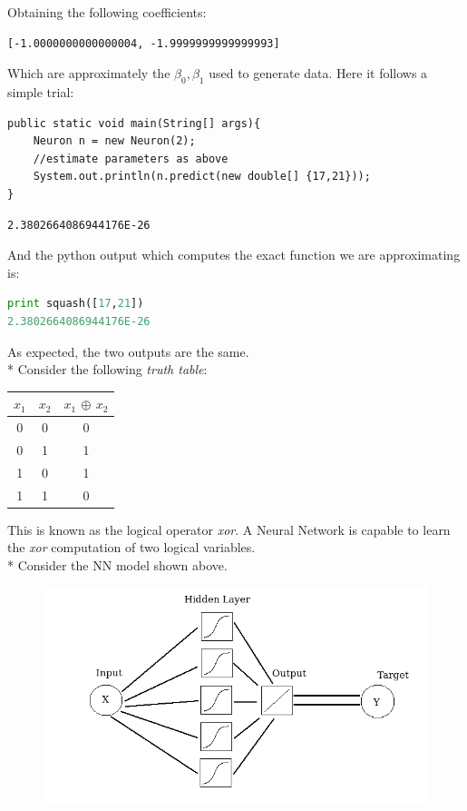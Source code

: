 \documentclass[10pt,a4paper]{article}
\begin{document}
Obtaining the following coefficients:
\begin{lstlisting}
[-1.0000000000000004, -1.9999999999999993]
\end{lstlisting}
Which are approximately the $\beta_0,\beta_1$ used to generate data. Here it follows a simple trial:
\begin{lstlisting}
public static void main(String[] args){
	Neuron n = new Neuron(2);
	//estimate parameters as above
	System.out.println(n.predict(new double[] {17,21}));
}
\end{lstlisting}
\begin{lstlisting}
2.3802664086944176E-26
\end{lstlisting}
And the python output which computes the exact function we are approximating is:
\begin{lstlisting}[language=Python]
print squash([17,21])
2.3802664086944176E-26
\end{lstlisting}
As expected, the two outputs are the same.\\*
Consider the following \emph{truth table}:
\begin{center}
\begin{tabular}{|c|c|c|}
	\hline 
	$x_1$ & $x_2$ & $x_1$ $\oplus$ $x_2$ \\ 
	\hline 
	0 & 0 & 0 \\ 
	\hline 
	0 & 1 & 1 \\ 
	\hline 
	1 & 0 & 1 \\ 
	\hline 
	1 & 1 & 0 \\ 
	\hline 
\end{tabular}
\end{center} 
This is known as the logical operator \textit{xor}. A Neural Network is capable to learn the \textit{xor} computation of two logical variables.\\*
Consider the NN model shown above.
\begin{figure}[h]
	\centering
	\includegraphics[scale=0.4]{img/mymodel}
	\label{fig:mymodel}
\end{figure}
\end{document}
